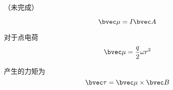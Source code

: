 
（未完成）

\begin{equation}
\bvec \mu = I \bvec A
\end{equation}

对于点电荷
\begin{equation}
\bvec \mu = \frac{q}{2} \omega r^2
\end{equation}

产生的力矩为
\begin{equation}
\bvec \tau = \bvec \mu \times \bvec B
\end{equation}
